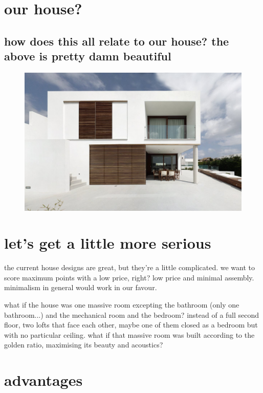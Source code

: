 \documentclass[paper=128mm:96mm, fontsize=9pt, pagesize]{scrartcl}
\begin{document}
\clearpage

\section{our house?}
\subsection{how does this all relate to our house?  the above is pretty damn beautiful}
\begin{figure}
	\centering
	\includegraphics[height=.5\textheight]{gfx/modern-minimalist-square-house-menorca-sun-shades-for-the-windows-ideas.jpg}
\end{figure}

\clearpage

\section{let's get a little more serious}

the current house designs are great, but they're a little complicated.
we want to score maximum points with a low price, right?
low price and minimal assembly.
minimalism in general would work in our favour.

what if the house was one massive room excepting the bathroom (only one bathroom...) and the mechanical room and the bedroom?
instead of a full second floor, two lofts that face each other, maybe one of them closed as a bedroom but with no particular ceiling.
what if that massive room was built according to the golden ratio, maximising its beauty and acoustics?

\clearpage

\section{advantages}
\end{document}
